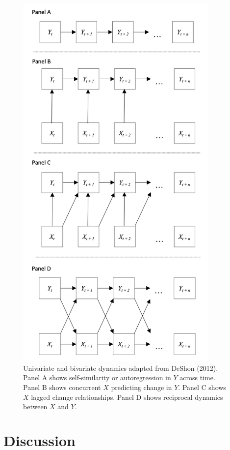 \documentclass[english,,man]{apa6}
\theoremstyle{definition}
\theoremstyle{definition}
\theoremstyle{definition}
\theoremstyle{remark}
\begin{document}
\begin{figure}

{\centering \includegraphics[width=3.93in]{figures/dynamics/dall} 

}

\caption{Univariate and bivariate dynamics adapted from DeShon (2012). Panel A shows self-similarity or autoregression in $Y$ across time. Panel B shows concurrent $X$ predicting change in $Y$. Panel C shows $X$ lagged change relationships. Panel D shows reciprocal dynamics between $X$ and $Y$.\label{dynamics_figure}}\label{fig:unnamed-chunk-16}
\end{figure}

\hypertarget{discussion}{%
\section{Discussion}\label{discussion}}
\end{document}
